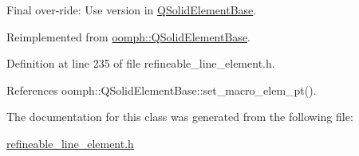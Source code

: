 Final over-\/ride\+: Use version in \hyperlink{classoomph_1_1QSolidElementBase}{Q\+Solid\+Element\+Base}. 



Reimplemented from \hyperlink{classoomph_1_1QSolidElementBase_aa7f14a039224fb4c513da587448d2c3b}{oomph\+::\+Q\+Solid\+Element\+Base}.



Definition at line 235 of file refineable\+\_\+line\+\_\+element.\+h.



References oomph\+::\+Q\+Solid\+Element\+Base\+::set\+\_\+macro\+\_\+elem\+\_\+pt().



The documentation for this class was generated from the following file\+:\begin{DoxyCompactItemize}
\item 
\hyperlink{refineable__line__element_8h}{refineable\+\_\+line\+\_\+element.\+h}\end{DoxyCompactItemize}
